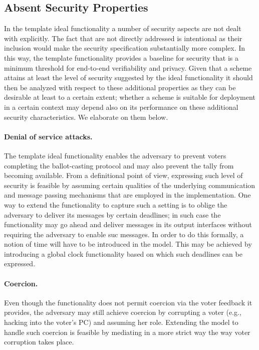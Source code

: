 \subsection{Absent Security Properties}

In the template ideal functionality a number of security aspects are
not dealt with explicitly. The fact that are not directly addressed is
intentional as their inclusion would make the security specification
substantially more complex. In this way, the template functionality
provides a baseline for security that is a minimum threshold for
end-to-end verifiability and privacy.  Given that a scheme attains at
least the level of security suggested by the ideal functionality it
should then be analyzed with respect to these additional properties as
they can be desirable at least to a certain extent; whether a scheme
is suitable for deployment in a certain context may depend also on its
performance on these additional security characteristics.  We
elaborate on them below.

\paragraph{Denial of service attacks.} The template ideal
functionality enables the adversary to prevent voters completing the
ballot-casting protocol and may also prevent the tally from becoming
available. From a definitional point of view, expressing such level of
security is feasible by assuming certain qualities of the underlying
communication and message passing mechanisms that are employed in the
implementation. One way to extend the functionality to capture such a
setting is to oblige the adversary to deliver its messages by certain
deadlines; in such case the functionality may go ahead and deliver
messages in its output interfaces without requiring the adversary to
enable suc messages. In order to do this formally, a notion of time
will have to be introduced in the model. This may be achieved by
introducing a global clock functionality based on which such deadlines
can be expressed.

\paragraph{Coercion.} Even though the functionality does not permit
coercion via the voter feedback it provides, the adversary may still
achieve coercion by corrupting a voter (e.g., hacking into the voter's
PC) and assuming her role. Extending the model to handle such coercion
is feasible by mediating in a more strict way the way voter corruption
takes place.

